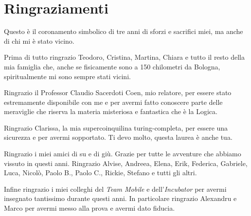 \documentclass[12pt,a4paper]{mimosis}
\begin{document}
\printbibliography

\chapter*{Ringraziamenti}
Questo è il coronamento simbolico di tre anni di sforzi e sacrifici miei, ma anche di chi mi
è stato vicino.

Prima di tutto ringrazio Teodoro, Cristina, Martina, Chiara e tutto il resto della
mia famiglia che, anche se fisicamente sono a 150 chilometri da Bologna, spiritualmente mi sono sempre stati vicini.

Ringrazio il Professor Claudio Sacerdoti Coen, mio relatore, per essere stato estremamente
disponibile con me e per avermi fatto conoscere parte delle meraviglie che riserva la
materia misteriosa e fantastica che è la Logica.

Ringrazio Clarissa, la mia supercoinquilina turing-completa, per essere una
sicurezza e per avermi sopportato. Ti devo molto, questa laurea è anche tua.

Ringrazio i miei amici di su e di giù. Grazie per tutte le avventure che abbiamo 
vissuto in questi anni. Ringrazio Alvise, Andreea, Elena, Erik,
Federica, Gabriele, Luca, Nicolò, Paolo B., Paolo C., Rickie, Stefano e tutti gli altri.

Infine ringrazio i miei colleghi del \textit{Team Mobile} e dell'\textit{Incubator}
per avermi insegnato tantissimo durante questi anni. In particolare ringrazio Alexandru e Marco per
avermi messo alla prova e avermi dato fiducia.
\end{document}
